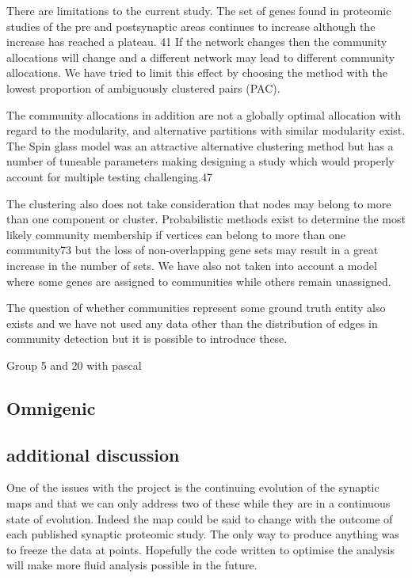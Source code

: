 There are limitations to the current study. The set of genes found in proteomic studies of the pre and postsynaptic areas continues to increase although the \cite{heil2018systems} increase has reached a plateau. 41  If the network changes then the community allocations will change and a different network may lead to different community allocations. We have tried to limit this effect by choosing the method with the lowest proportion of ambiguously clustered pairs (PAC).

The community allocations in addition are not a globally optimal allocation with regard to the modularity, and alternative partitions with similar modularity exist. The Spin glass model was an attractive alternative clustering method but has a number of tuneable parameters making designing a study which would properly account for multiple testing challenging.47 

The clustering also does not take consideration that nodes may belong to more than one component or cluster. Probabilistic methods exist to determine the most likely community membership if vertices can belong to more than one community73 but the loss of non-overlapping gene sets may result in a great increase in the number of sets. We have also not taken into account a model where some genes are assigned to communities while others remain unassigned.

The question of whether communities represent some ground truth entity also exists \cite{peel2017ground}  and we have not used any data other than the distribution of edges in community detection but it is possible to introduce these.  \cite{newman2016structure} 

Group 5 and 20 with pascal 
\subsection{Omnigenic}

\subsection{additional discussion}

One of the issues with the project is the continuing evolution of the synaptic maps and that we can only address two of these while they are in a continuous state of evolution. Indeed the map could be said to change with the outcome of each published synaptic proteomic study. The only way to produce anything was to freeze the data at points. Hopefully the code written to optimise the analysis will make more fluid analysis possible in the future.

